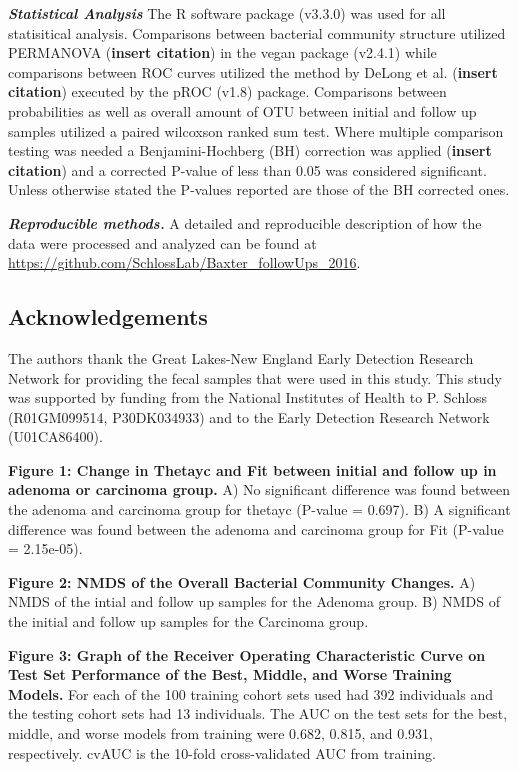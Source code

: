 \documentclass[12pt,]{article}
\begin{document}
\textbf{\emph{Statistical Analysis}} The R software package (v3.3.0) was
used for all statisitical analysis. Comparisons between bacterial
community structure utilized PERMANOVA (\textbf{insert citation}) in the
vegan package (v2.4.1) while comparisons between ROC curves utilized the
method by DeLong et al. (\textbf{insert citation}) executed by the pROC
(v1.8) package. Comparisons between probabilities as well as overall
amount of OTU between initial and follow up samples utilized a paired
wilcoxson ranked sum test. Where multiple comparison testing was needed
a Benjamini-Hochberg (BH) correction was applied (\textbf{insert
citation}) and a corrected P-value of less than 0.05 was considered
significant. Unless otherwise stated the P-values reported are those of
the BH corrected ones.

\textbf{\emph{Reproducible methods.}} A detailed and reproducible
description of how the data were processed and analyzed can be found at
\url{https://github.com/SchlossLab/Baxter_followUps_2016}.

\newpage

\subsection{Acknowledgements}\label{acknowledgements}

The authors thank the Great Lakes-New England Early Detection Research
Network for providing the fecal samples that were used in this study.
This study was supported by funding from the National Institutes of
Health to P. Schloss (R01GM099514, P30DK034933) and to the Early
Detection Research Network (U01CA86400).

\newpage

\textbf{Figure 1: Change in Thetayc and Fit between initial and follow
up in adenoma or carcinoma group.} A) No significant difference was
found between the adenoma and carcinoma group for thetayc (P-value =
0.697). B) A significant difference was found between the adenoma and
carcinoma group for Fit (P-value = 2.15e-05).

\textbf{Figure 2: NMDS of the Overall Bacterial Community Changes.} A)
NMDS of the intial and follow up samples for the Adenoma group. B) NMDS
of the initial and follow up samples for the Carcinoma group.

\textbf{Figure 3: Graph of the Receiver Operating Characteristic Curve
on Test Set Performance of the Best, Middle, and Worse Training Models.}
For each of the 100 training cohort sets used had 392 individuals and
the testing cohort sets had 13 individuals. The AUC on the test sets for
the best, middle, and worse models from training were 0.682, 0.815, and
0.931, respectively. cvAUC is the 10-fold cross-validated AUC from
training.
\end{document}
